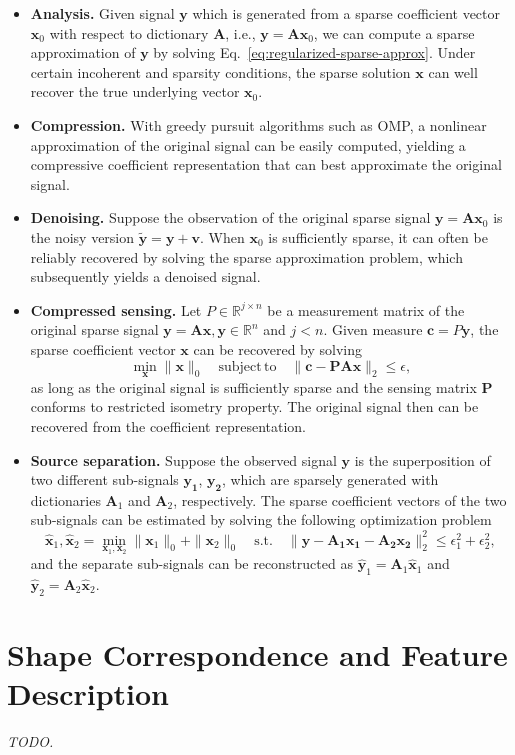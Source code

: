 \begin{itemize}

\item \textbf{Analysis.} Given signal $\mathbf{y}$ which is generated from a sparse
coefficient vector $\mathbf{x}_0$ with respect to dictionary $\mathbf{A}$, i.e.,
$\mathbf{y}=\mathbf{A}\mathbf{x}_0$, we can compute a sparse approximation of
$\mathbf{y}$ by solving Eq.~\ref{eq:regularized-sparse-approx}. Under certain
incoherent and sparsity conditions, the sparse solution $\mathbf{x}$ can well
recover the true underlying vector $\mathbf{x}_0$.

\item \textbf{Compression.} With greedy pursuit algorithms such as OMP, a
 nonlinear approximation of the original signal can be easily
 computed, yielding a compressive coefficient representation that can best
 approximate the original signal.

\item \textbf{Denoising.} Suppose the observation of the original sparse
signal $\mathbf{y}=\mathbf{A}\mathbf{x}_0$ is the noisy version $\mathbf{\tilde{y}}=\mathbf{y}+\mathbf{v}$.
When $\mathbf{x}_0$ is sufficiently sparse, it can often be reliably recovered
by solving the sparse approximation problem, which subsequently yields a
denoised signal.

\item \textbf{Compressed sensing.} Let $P\in\mathbb{R}^{j\times n}$ be a
measurement matrix of the original sparse signal
$\mathbf{y}=\mathbf{A}\mathbf{x}, \mathbf{y}\in\mathbb{R}^n$
and $j < n$. Given measure $\mathbf{c}=P\mathbf{y}$, the sparse coefficient vector
$\mathbf{x}$ can be recovered by solving
\begin{equation}
\min_\mathbf{x} \|\mathbf{x}\|_0 \quad \mathrm{subject\,to} \quad \|\mathbf{c}-\mathbf{P}\mathbf{A}\mathbf{x}\|_2 \leq \epsilon,
\end{equation}
as long as the original signal is sufficiently sparse and the sensing matrix $\mathbf{P}$ conforms to restricted isometry property.
The original signal then can be recovered from the coefficient representation.

\item \textbf{Source separation.} Suppose the observed signal $\mathbf{y}$ is the superposition of
two different sub-signals $\mathbf{y_1}$, $\mathbf{y_2}$, which are sparsely generated with dictionaries
$\mathbf{A}_1$ and $\mathbf{A}_2$, respectively. The sparse coefficient vectors of the two sub-signals
can be estimated by solving the following optimization problem
\begin{equation}
\hat{\mathbf{x}}_1,\hat{\mathbf{x}}_2 = \min_{\mathbf{x}_1,\mathbf{x}_2} \|\mathbf{x}_1\|_0 + \|\mathbf{x}_2\|_0 \quad \mathrm{s.t.} \quad \|\mathbf{y}-\mathbf{A_1 x_1} - \mathbf{A_2 x_2}\|_2^2 \leq \epsilon_1^2 + \epsilon_2^2,
\end{equation}
and the separate sub-signals can be reconstructed as $\hat{\mathbf{y}}_1=\mathbf{A}_1\hat{\mathbf{x}}_1$ and $\hat{\mathbf{y}}_2=\mathbf{A}_2\hat{\mathbf{x}}_2$.

\end{itemize}

\section{Shape Correspondence and Feature Description}
\emph{TODO.}

